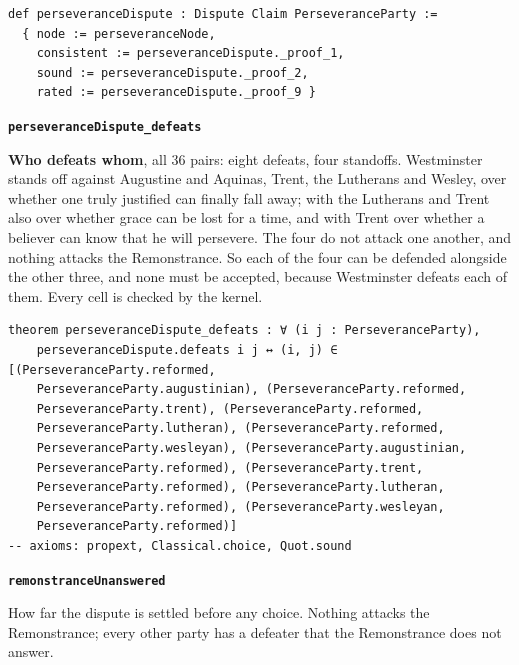 \documentclass[11pt]{article}
\begin{document}
{\small\begin{verbatim}
def perseveranceDispute : Dispute Claim PerseveranceParty :=
  { node := perseveranceNode,
    consistent := perseveranceDispute._proof_1,
    sound := perseveranceDispute._proof_2,
    rated := perseveranceDispute._proof_9 }
\end{verbatim}}
\par\medskip\noindent\textbf{\texttt{perseverance\allowbreak{}Dispute\_\allowbreak{}defeats}}\par\nobreak\noindent
\textbf{Who defeats whom}, all 36 pairs: eight defeats, four standoffs. Westminster stands off against Augustine and Aquinas, Trent, the Lutherans and Wesley, over whether one truly justified can finally fall away; with the Lutherans and Trent also over whether grace can be lost for a time, and with Trent over whether a believer can know that he will persevere. The four do not attack one another, and nothing attacks the Remonstrance. So each of the four can be defended alongside the other three, and none must be accepted, because Westminster defeats each of them. Every cell is checked by the kernel.

{\small\begin{verbatim}
theorem perseveranceDispute_defeats : ∀ (i j : PerseveranceParty),
    perseveranceDispute.defeats i j ↔ (i, j) ∈ [(PerseveranceParty.reformed,
    PerseveranceParty.augustinian), (PerseveranceParty.reformed,
    PerseveranceParty.trent), (PerseveranceParty.reformed,
    PerseveranceParty.lutheran), (PerseveranceParty.reformed,
    PerseveranceParty.wesleyan), (PerseveranceParty.augustinian,
    PerseveranceParty.reformed), (PerseveranceParty.trent,
    PerseveranceParty.reformed), (PerseveranceParty.lutheran,
    PerseveranceParty.reformed), (PerseveranceParty.wesleyan,
    PerseveranceParty.reformed)]
-- axioms: propext, Classical.choice, Quot.sound
\end{verbatim}}
\par\medskip\noindent\textbf{\texttt{remonstrance\allowbreak{}Unanswered}}\par\nobreak\noindent
How far the dispute is settled before any choice. Nothing attacks the Remonstrance; every other party has a defeater that the Remonstrance does not answer.
\end{document}
